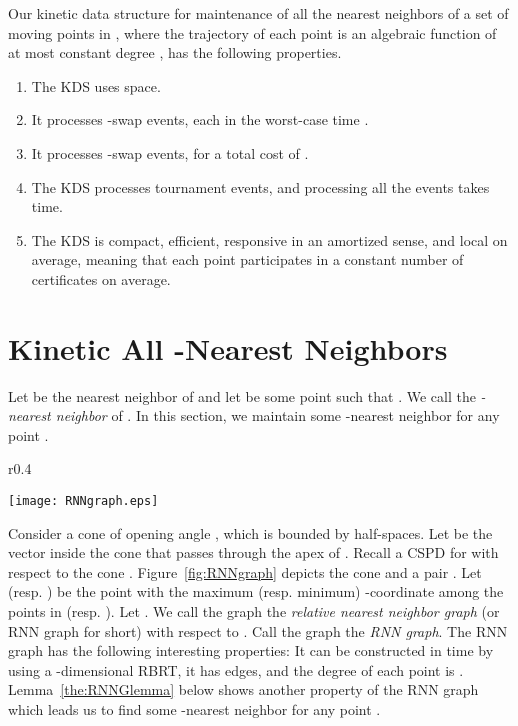 \documentclass[11pt]{llncs}
\begin{document}
\begin{theorem}\label{the:KineticAllNN}
Our kinetic data structure for maintenance of all the nearest neighbors of a set of  moving points in , where the trajectory of each point is an algebraic function of at most constant degree , has the following properties. 
\begin{enumerate}
\item The KDS uses  space.
\item It processes  -swap events, each in the worst-case time .
\item It processes  -swap events, for a total cost of .
\item The KDS processes  tournament events, and processing all the events takes  time.
\item The KDS is compact, efficient, responsive in an amortized sense, and local on average, meaning that each point participates in a constant number of certificates on average.
\end{enumerate}
\end{theorem}
\section{Kinetic All -Nearest Neighbors}\label{sec:KineticEpsANN}
Let  be the nearest neighbor of  and let  be some point such that . We call  the \textit{-nearest neighbor} of . In this section,  we maintain some -nearest neighbor for any point .

\begin{wrapfigure}{r}{0.4\textwidth}
\vspace{-10pt}
  \begin{center}
    \texttt{[image: RNNgraph.eps]}
  \end{center}
  \vspace{-15pt}
  \caption{\small The point  (resp. ) has minimum (resp. maximum) -coordinate among the points in  (resp. ).}
  \vspace{-10pt}
  \label{fig:RNNgraph}
\end{wrapfigure}
Consider a cone  of opening angle , which is bounded by  half-spaces. Let  be the  vector inside the cone  that passes through the apex of . Recall a CSPD  for  with respect to the cone . Figure~\ref{fig:RNNgraph} depicts the cone  and a pair . Let  (resp. ) be the point with the maximum (resp. minimum) -coordinate among the points in  (resp. ). Let . We call the graph  the \textit{relative nearest neighbor graph} (or RNN graph for short) with respect to . Call the graph  the \textit{RNN graph}.  The RNN graph has the following interesting properties:  It can be constructed in  time by using a -dimensional RBRT,  it has  edges, and  the degree of each point is . Lemma~\ref{the:RNNGlemma} below shows another property of the RNN graph which leads us to find some -nearest neighbor for any point .
\end{document}
